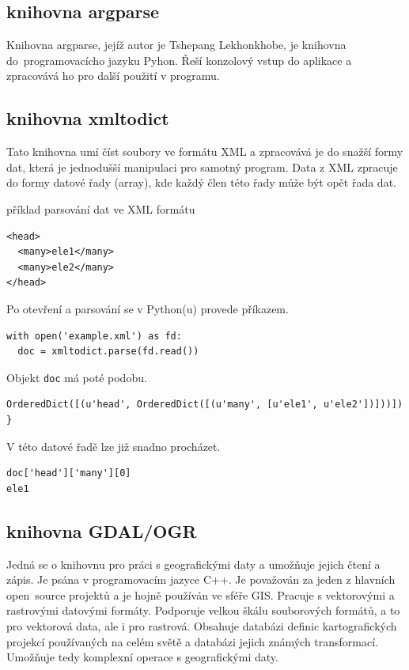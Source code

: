   
\subsection{knihovna argparse}
\label{argparse} 
Knihovna argparse, jejíž autor je Tshepang Lekhonkhobe, je knihovna 
do~programovacícho jazyku Pyhon. Řeší konzolový vstup do aplikace a zpracovává 
ho pro další použití v programu.\cite{argparse}


\subsection{knihovna xmltodict}
\label{xmltodict} 
Tato knihovna umí číst soubory ve formátu XML a zpracovává je do snažší formy 
dat, která je jednodušší manipulaci pro samotný program. Data z XML zpracuje
do formy datové řady (array), kde každý člen této řady může být opět řada dat.\cite{xmltodict}

příklad parsování dat ve XML formátu

{\scriptsize
\begin{lstlisting}
<head>
  <many>ele1</many>
  <many>ele2</many>
</head>
\end{lstlisting}
}

Po otevření a parsování se v Python(u) provede příkazem.

{\scriptsize
\lstset{language=Python}
\begin{lstlisting}
with open('example.xml') as fd: 
  doc = xmltodict.parse(fd.read()) 
\end{lstlisting}
}

Objekt {\tt doc} má poté podobu.

{\scriptsize
\lstset{language=Python}
\begin{lstlisting}
OrderedDict([(u'head', OrderedDict([(u'many', [u'ele1', u'ele2'])]))]) }
\end{lstlisting}
}

V této datové řadě lze již snadno procházet. 

{\scriptsize
\lstset{language=Python}
\begin{lstlisting}
doc['head']['many'][0]
ele1
\end{lstlisting}
}


\subsection{knihovna GDAL/OGR}
\label{GDAL/OGR}
Jedná se o knihovnu pro práci s geografickými daty a umožňuje jejich čtení a zápis.
Je psána v programovacím jazyce C++. Je považován za jeden z hlavních 
open~source projektů a je hojně používán ve sféře GIS. Pracuje s vektorovými a 
rastrovými datovými formáty. Podporuje velkou škálu souborových formátů, a to 
pro vektorová data, ale i pro rastrová. Obsahuje databázi definic kartografických
projekcí používaných na celém světě a databázi jejich známých transformací. 
Umožňuje tedy komplexní operace s geografickými daty. \cite{GDAL}


